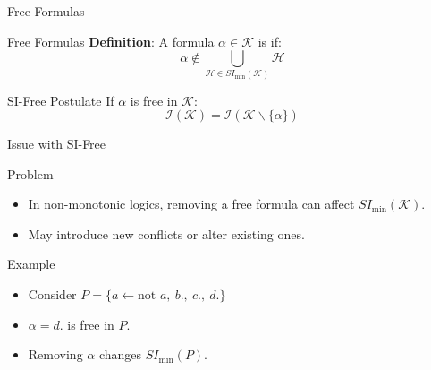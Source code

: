 \begin{frame}{Free Formulas}
    \begin{block}{Free Formulas}
        \textbf{Definition}: A formula \( \alpha \in \mathcal{K} \) is  if:
        \[
            \alpha \notin \bigcup\limits_{\mathcal{H} \in SI_{\min}(\mathcal{K})} \mathcal{H}
        \]
    \end{block}
    \begin{block}{SI-Free Postulate}
        If \( \alpha \) is free in \( \mathcal{K} \):
        \[
            \mathcal{I}(\mathcal{K}) = \mathcal{I}(\mathcal{K} \backslash \{\alpha\})
        \]
    \end{block}
\end{frame}

\begin{frame}{Issue with SI-Free}
    \begin{alertblock}{Problem}
        \begin{itemize}
            \item In non-monotonic logics, removing a free formula can affect \( SI_{\min}(\mathcal{K}) \).
            \item May introduce new conflicts or alter existing ones.
        \end{itemize}
    \end{alertblock}
    \begin{exampleblock}{Example}
        \begin{itemize}
            \item Consider \( P = \{ a \leftarrow \text{not }a,\ b.,\ c.,\ d. \} \)
            \item \( \alpha = d. \) is free in \( P \).
            \item Removing \( \alpha \) changes \( SI_{\min}(P) \).
        \end{itemize}
    \end{exampleblock}
\end{frame}

